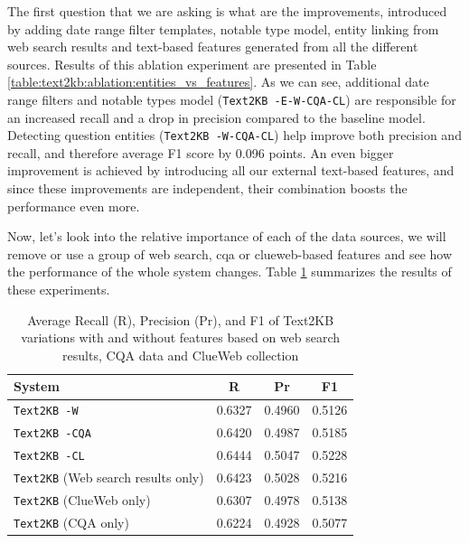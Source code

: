 The first question that we are asking is what are the improvements, introduced by adding date range filter templates, notable type model, entity linking from web search results and text-based features generated from all the different sources.
Results of this ablation experiment are presented in Table \ref{table:text2kb:ablation:entities_vs_features}.
As we can see, additional date range filters and notable types model (\texttt{Text2KB -E-W-CQA-CL}) are responsible for an increased recall and a drop in precision compared to the baseline model.
Detecting question entities (\texttt{Text2KB -W-CQA-CL}) help improve both precision and recall, and therefore average F1 score by 0.096 points.
An even bigger improvement is achieved by introducing all our external text-based features, and since these improvements are independent, their combination boosts the performance even more.

Now, let's look into the relative importance of each of the data sources, we will remove or use a group of web search, cqa or clueweb-based features and see how the performance of the whole system changes.
Table \ref{table:text2kb:ablation:features} summarizes the results of these experiments.

\begin{table}
\centering
\caption{Average Recall (R), Precision (Pr), and F1 of Text2KB variations with and without features based on web search results, CQA data and ClueWeb collection}
\label{table:text2kb:ablation:features}
\begin{tabular}{| p{7cm} | c | c | c | }
\hline
System & R & Pr &  F1 \\
\hline
\texttt{Text2KB -W} & 0.6327 & 0.4960 & 0.5126 \\
\texttt{Text2KB -CQA} & 0.6420 & 0.4987 & 0.5185 \\
\texttt{Text2KB -CL} & 0.6444 & 0.5047 & 0.5228 \\
\hline
\texttt{Text2KB} (Web search results only) & 0.6423 & 0.5028 & 0.5216 \\
\texttt{Text2KB} (ClueWeb only) & 0.6307 & 0.4978 & 0.5138 \\
\texttt{Text2KB} (CQA only) & 0.6224 & 0.4928 & 0.5077 \\
\hline
\end{tabular}
\end{table}

